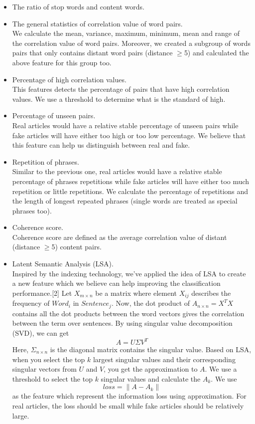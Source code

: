 \begin{itemize}
  \setlength{\itemsep}{4pt}
    \setlength{\parskip}{0pt}
  \item The ratio of stop words and content words.
  \item The general statistics of correlation value of word pairs.\\[5pt]
We calculate the mean, variance, maximum, minimum, mean and range of the correlation value of word pairs. Moreover, we created a subgroup of words pairs that only contains distant word pairs (distance  $\geq$5) and calculated the above feature for this group too.
 \item Percentage of high correlation values.\\[5pt]
This features detects the percentage of pairs that have high correlation values. We use a threshold to determine what is the standard of high.
 \item Percentage of unseen pairs.\\[5pt]
Real articles would have a relative stable percentage of unseen pairs while fake articles will have either too high or too low percentage. We believe that this feature can help us distinguish between real and fake.
 \item Repetition of phrases.\\[5pt]
Similar to the previous one, real articles would have a relative stable percentage of phrases repetitions while fake articles will have either too much repetition or little repetitions. We calculate the percentage of repetitions and the length of longest repeated phrases (single words are treated as special phrases too).
 \item Coherence score.\\[5pt]
Coherence score are defined as the average correlation value of distant (distance $\geq$5) content pairs.
 \item Latent Semantic Analysis (LSA).\\[5pt]
Inspired by the indexing technology, we've applied the idea of LSA to create a new feature which we believe can help improving the classification performance.[2] Let $X_{m\times{n}}$ be a matrix where element $X_{ij}$ describes the frequency of $Word_{i}$ in $Sentence_{j}$. Now, the dot product of $A_{n\times{n}} = X^{T}X$ contains all the dot products between the word vectors gives the correlation between the term over sentences. By using singular value decomposition (SVD), we can get  \begin{equation}
	A = U\Sigma{V^T}	
\end{equation}
Here, $\Sigma_{n\times{n}}$ is the diagonal matrix contains the singular value. Based on LSA, when you select the top $k$ largest singular values and their corresponding singular vectors from $U$ and $V$, you get the approximation to $A$. We use a threshold to select the top $k$ singular values and calculate the $A_{k}$. We use
\begin{equation}
	loss = \|A - A_{k}\|
\end{equation}
as the feature which represent the information loss using approximation. For real articles, the loss should be small while fake articles should be relatively large.


\end{itemize}
